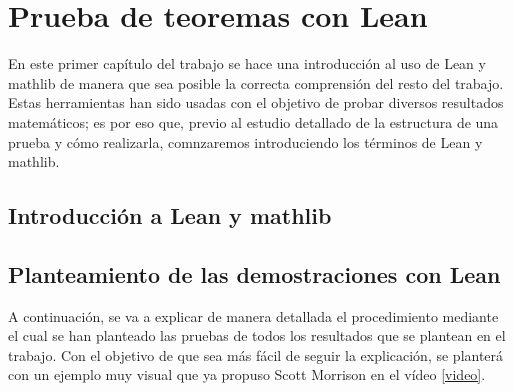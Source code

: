 \chapter{Prueba de teoremas con Lean}
En este primer capítulo del trabajo se hace una introducción al uso de Lean
y mathlib de manera que sea posible la correcta comprensión del resto del
trabajo. Estas herramientas han sido usadas con el objetivo de probar diversos
resultados matemáticos; es por eso que, previo al estudio detallado de la
estructura de una prueba y cómo realizarla, comnzaremos introduciendo los
términos de Lean y mathlib.

\section{Introducción a Lean y mathlib}


\section{Planteamiento de las demostraciones con Lean}
A continuación, se va a explicar de manera detallada el procedimiento mediante
el cual se han planteado las pruebas de todos los resultados que se plantean
en el trabajo. Con el objetivo de que sea más fácil de seguir la explicación,
se planterá con un ejemplo muy visual que ya propuso Scott Morrison en el
vídeo \ref{video}.

